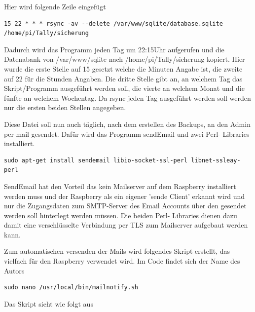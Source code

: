 \documentclass[11pt,a4paper]{article} %
\begin{document}
Hier wird folgende Zeile eingefügt
\begin{frame}

\begin{lstlisting}
15 22 * * * rsync -av --delete /var/www/sqlite/database.sqlite  /home/pi/Tally/sicherung
\end{lstlisting}
\end{frame}
Dadurch wird das Programm jeden Tag um 22:15Uhr aufgerufen und die Datenabank von /var/www/sqlite nach /home/pi/Tally/sicherung  kopiert. Hier wurde die erste Stelle auf 15 gesetzt welche die Minuten Angabe ist, die zweite auf 22 für die Stunden Angaben. Die dritte Stelle gibt an, an welchem Tag das Skript/Programm ausgeführt werden soll, die vierte an welchem Monat und die fünfte an welchem Wochentag. Da rsync jeden Tag ausgeführt werden soll werden nur die ersten beiden Stellen angegeben.
\par
Diese Datei soll nun auch täglich, nach dem erstellen des Backups, an den Admin per mail gesendet.
Dafür wird das Programm sendEmail und zwei Perl- Libraries installiert.
\begin{frame}

\begin{lstlisting}
sudo apt-get install sendemail libio-socket-ssl-perl libnet-ssleay-perl
\end{lstlisting}
\end{frame}
SendEmail hat den Vorteil das kein Mailserver auf dem Raspberry installiert werden muss und der Raspberry als ein eigener 'sende Client' erkannt wird und nur die Zugangsdaten zum SMTP-Server des Email Accounts über den gesendet werden soll hinterlegt werden müssen. Die beiden Perl- Libraries dienen dazu damit eine verschlüsselte Verbindung per TLS zum Mailserver aufgebaut werden kann.
\par
Zum automatischen versenden der Mails wird folgendes Skript erstellt, das vielfach für den Raspberry verwendet wird. Im Code findet sich der Name des Autors \cite{10}
\begin{frame}

\begin{lstlisting}
sudo nano /usr/local/bin/mailnotify.sh
\end{lstlisting}
\end{frame}
\newpage
Das Skript sieht wie folgt aus
\end{document}
